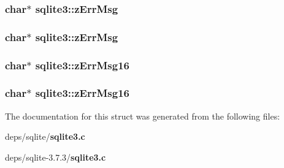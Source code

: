 \subsubsection{\setlength{\rightskip}{0pt plus 5cm}char$\ast$ \bf{sqlite3::z\-Err\-Msg}}\label{structsqlite3_2334c0f25b17be60afa533243355accb}


\subsubsection{\setlength{\rightskip}{0pt plus 5cm}char$\ast$ \bf{sqlite3::z\-Err\-Msg}}\label{structsqlite3_2334c0f25b17be60afa533243355accb}


\subsubsection{\setlength{\rightskip}{0pt plus 5cm}char$\ast$ \bf{sqlite3::z\-Err\-Msg16}}\label{structsqlite3_3078b10b7aa5d10b0dd61a2164659eb4}


\subsubsection{\setlength{\rightskip}{0pt plus 5cm}char$\ast$ \bf{sqlite3::z\-Err\-Msg16}}\label{structsqlite3_3078b10b7aa5d10b0dd61a2164659eb4}




The documentation for this struct was generated from the following files:\begin{CompactItemize}
\item 
deps/sqlite/\bf{sqlite3.c}\item 
deps/sqlite-3.7.3/\bf{sqlite3.c}\end{CompactItemize}
